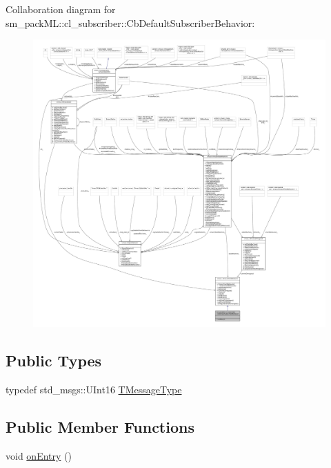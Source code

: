 Collaboration diagram for sm\+\_\+pack\+ML\+:\+:cl\+\_\+subscriber\+:\+:Cb\+Default\+Subscriber\+Behavior\+:
\nopagebreak
\begin{figure}[H]
\begin{center}
\leavevmode
\includegraphics[width=350pt]{classsm__packML_1_1cl__subscriber_1_1CbDefaultSubscriberBehavior__coll__graph}
\end{center}
\end{figure}
\subsection*{Public Types}
\begin{DoxyCompactItemize}
\item 
typedef std\+\_\+msgs\+::\+U\+Int16 \hyperlink{classsm__packML_1_1cl__subscriber_1_1CbDefaultSubscriberBehavior_aa4a14643d9c7effc94d4fb89f9d276e1}{T\+Message\+Type}
\end{DoxyCompactItemize}
\subsection*{Public Member Functions}
\begin{DoxyCompactItemize}
\item 
void \hyperlink{classsm__packML_1_1cl__subscriber_1_1CbDefaultSubscriberBehavior_aef08a915fdc4e4c17e907822ac2a22e6}{on\+Entry} ()
\end{DoxyCompactItemize}


